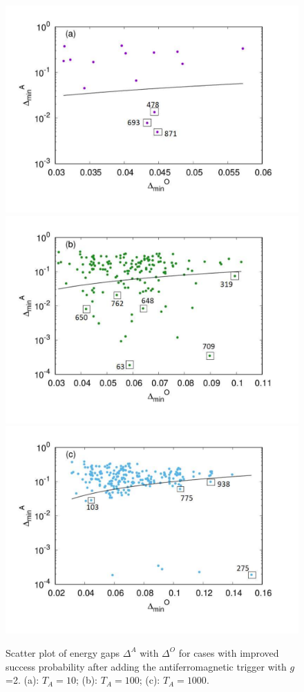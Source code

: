 \documentclass[../main.tex]{subfiles}
\begin{document}
\begin{figure}
\centering 
\includegraphics[scale=0.35 ]{selected_T10_g2.pdf}
\includegraphics[scale=0.35 ]{selected_T100_g2.pdf}
\includegraphics[scale=0.35 ]{selected_T1000_g2.pdf}
\caption{Scatter plot of energy gaps $\Delta^A $ with $\Delta^O$ for cases with improved success probability after adding the antiferromagnetic trigger with $g$=2. (a): $T_A=10$; (b): $T_A=100$; (c): $T_A=1000$.}
\label{fig:a41}
\end{figure}
\end{document}
